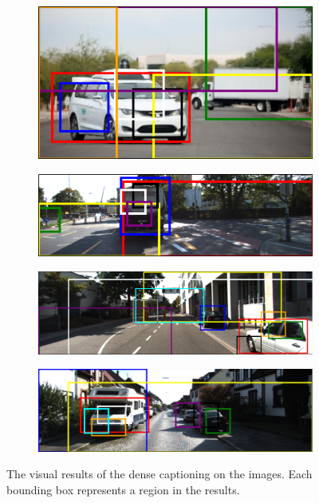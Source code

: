 \begin{figure}[ht]
\begin{subfigure}{.5\textwidth}
  \centering
  \vspace*{3mm}
  \includegraphics[width=.8\linewidth]{Figure_1.png}  
  \label{fig:sub-first}
\end{subfigure}
\begin{subfigure}{.5\textwidth}
  \centering
  \vspace*{3mm}
  \includegraphics[width=.8\linewidth]{Figure_2.png}  
  \label{fig:sub-second}
\end{subfigure}
\begin{subfigure}{.5\textwidth}
  \centering
  \vspace*{3mm}
  \includegraphics[width=.8\linewidth]{Figure_3.png}  
  \label{fig:sub-third}
\end{subfigure}
\begin{subfigure}{.5\textwidth}
  \centering
  \vspace*{3mm}
  \includegraphics[width=.8\linewidth]{Figure_4.png}  
  \label{fig:sub-fourth}
\end{subfigure}
\caption{The visual results of the dense captioning on the images. Each bounding box represents a region in the results. }
\label{fig:fig}
\end{figure}

